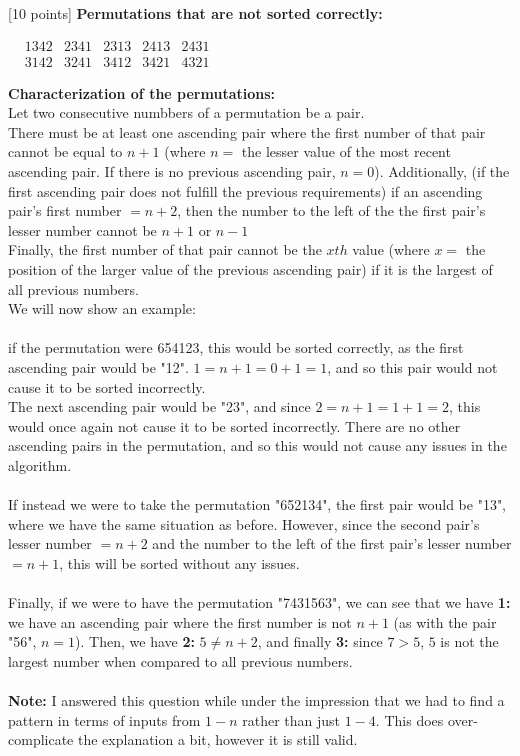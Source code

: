 \documentclass[12pt]{article}
\newcounter{ques}
\newenvironment{question}{\stepcounter{ques}{\noindent\bf Question \arabic{ques}:}}{\vspace{5mm}}
\begin{document}
\begin{question}[10 points]
\textbf{Permutations that are not sorted correctly:}\\
\begin{center}$
  \begin{matrix}
    &1342 &2341 &2313 &2413 &2431\\
    &3142 &3241 &3412 &3421 &4321
  \end{matrix}$
\end{center}


\textbf{Characterization of the permutations:}\\
Let two consecutive numbbers of a permutation be a pair.\\



There must be at least one ascending pair where the first number of that pair cannot be equal to $n+1$ (where $n=$ the lesser value of the most recent ascending pair. If there is no previous ascending pair, $n=0$). Additionally, (if the first ascending pair does not fulfill the previous requirements) if an ascending pair's first number $=n+2$, then the number to the left of the the first pair's lesser number cannot be $n+1$ or $n-1$\\
Finally, the first number of that pair cannot be the $xth$ value (where $x=$ the position of the larger value of the previous ascending pair) if it is the largest of all previous numbers.\\
We will now show an example:\\\\
if the permutation were 654123, this would be sorted correctly, as the first ascending pair would be "12". $1=n+1=0+1=1$, and so this pair would not cause it to be sorted incorrectly.\\
The next ascending pair would be "23", and since $2=n+1=1+1=2$, this would once again not cause it to be sorted incorrectly. There are no other ascending pairs in the permutation, and so this would not cause any issues in the algorithm.\\\\
If instead we were to take the permutation "652134", the first pair would be "13", where we have the same situation as before. However, since the second pair's lesser number $=n+2$ and the number to the left of the first pair's lesser number $=n+1$, this will be sorted without any issues.\\\\
Finally, if we were to have the permutation "7431563", we can see that we have \textbf{1:} we have an ascending pair where the first number is not $n+1$ (as with the pair "56", $n=1$). Then, we have \textbf{2:} $5\neq n+2$, and finally \textbf{3:} since $7>5$, $5$ is not the largest number when compared to all previous numbers.\\\\
\textbf{Note:} I answered this question while under the impression that we had to find a pattern in terms of inputs from $1-n$ rather than just $1-4$. This does over-complicate the explanation a bit, however it is still valid.

\end{question}
\end{document}
